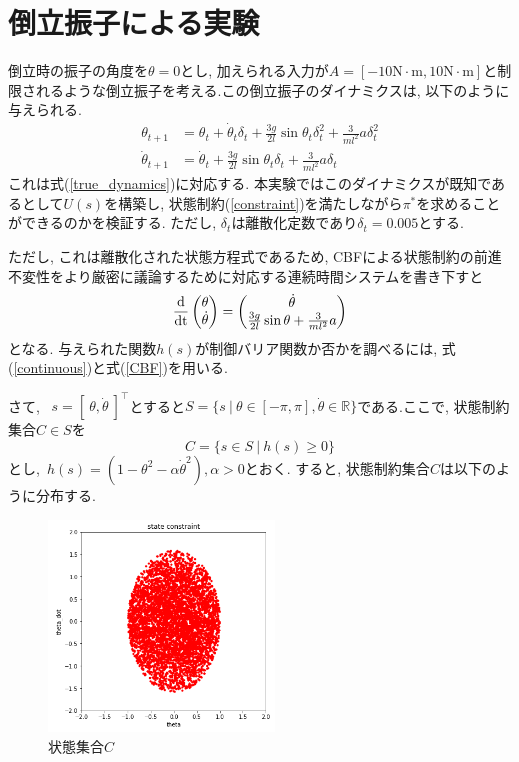 \documentclass{jsarticle}
\newcommand{\odif}[2]{\frac{\rm{d}#1}{\rm{d}#2}}
\begin{document}
\section{倒立振子による実験}
倒立時の振子の角度を$\theta=0$とし, 加えられる入力が$A=[-10\textrm{N}\cdot\textrm{m},10\textrm{N}\cdot\textrm{m}]$と制限されるような倒立振子を考える.この倒立振子のダイナミクスは, 以下のように与えられる.
\begin{align}
	\theta_{t+1} &= \theta_t+\dot{\theta}_t\delta_t+\frac{3g}{2l}\sin{\theta_t}\delta_t^2+\frac{3}{ml^2}a\delta_t^2 \\
	\dot{\theta}_{t+1} &=  \dot{\theta}_t+\frac{3g}{2l}\sin{\theta_t}\delta_t+\frac{3}{ml^2}a\delta_t
\end{align}
これは式(\ref{true_dynamics})に対応する. 本実験ではこのダイナミクスが既知であるとして$U(s)$を構築し, 状態制約(\ref{constraint})を満たしながら$\pi^{*}$を求めることができるのかを検証する. ただし, $\delta_t$は離散化定数であり$\delta_t=0.005$とする.\par
ただし, これは離散化された状態方程式であるため, CBFによる状態制約の前進不変性をより厳密に議論するために対応する連続時間システムを書き下すと
\begin{equation}
	\odif{}{t}\begin{pmatrix}\theta \\ \dot{\theta}\end{pmatrix} = 
		\begin{pmatrix}\dot{\theta} \\ \frac{3g}{2l}\sin{\theta} + \frac{3}{ml^2}a \end{pmatrix} \label{continuous}
\end{equation}
となる. 与えられた関数$h(s)$が制御バリア関数か否かを調べるには, 式(\ref{continuous})と式(\ref{CBF})を用いる.\par
さて, ~$s=[~\theta, \dot{\theta}~]^{\top}$とすると$S = \{s~|~\theta\in[-\pi, \pi], \dot{\theta}\in\mathbb{R}\}$である.ここで, 状態制約集合$C\in S$を
\begin{equation}
	C=\{s\in S~|~h(s)\geq 0\}
\end{equation}とし,~$h(s)=(1-\theta^2-\alpha\dot{\theta}^2), \alpha>0$とおく. すると, 状態制約集合$C$は以下のように分布する. 
\begin{figure}[h]
	\centering
 	\includegraphics[width=6cm]{region.png}
 	\caption{状態集合$C$}
\end{figure}\\
\end{document}
